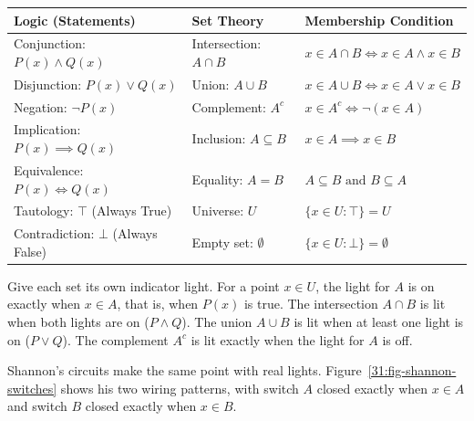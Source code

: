 \begin{center}
\small
\renewcommand{\arraystretch}{1.25}
\begin{tabular}{lll}
\hline
\textbf{Logic (Statements)} & \textbf{Set Theory} & \textbf{Membership Condition} \\
\hline
Conjunction: $P(x) \land Q(x)$ & Intersection: $A \cap B$ & $x \in A \cap B \iff x \in A \land x \in B$ \\
Disjunction: $P(x) \lor Q(x)$ & Union: $A \cup B$ & $x \in A \cup B \iff x \in A \lor x \in B$ \\
Negation: $\neg P(x)$ & Complement: $A^c$ & $x \in A^c \iff \neg(x \in A)$ \\
Implication: $P(x) \implies Q(x)$ & Inclusion: $A \subseteq B$ & $x \in A \implies x \in B$ \\
Equivalence: $P(x) \iff Q(x)$ & Equality: $A = B$ & $A \subseteq B \text{ and } B \subseteq A$ \\
Tautology: $\top$ (Always True) & Universe: $U$ & $\{x \in U : \top\} = U$ \\
Contradiction: $\bot$ (Always False) & Empty set: $\emptyset$ & $\{x \in U : \bot\} = \emptyset$ \\
\hline
\end{tabular}
\end{center}

\begin{intuitionbox}
Give each set its own indicator light. For a point $x \in U$, the light for $A$ is on exactly when $x \in A$, that is, when $P(x)$ is true. The intersection $A \cap B$ is lit when both lights are on ($P \land Q$). The union $A \cup B$ is lit when at least one light is on ($P \lor Q$). The complement $A^c$ is lit exactly when the light for $A$ is off.
\end{intuitionbox}

Shannon's circuits make the same point with real lights. Figure~\ref{31:fig-shannon-switches} shows his two wiring patterns, with switch $A$ closed exactly when $x \in A$ and switch $B$ closed exactly when $x \in B$.


